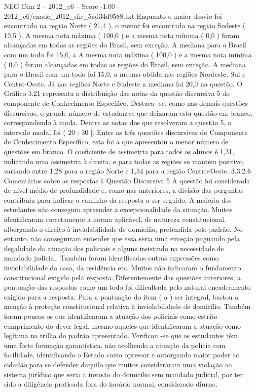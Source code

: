 \begin{textsample}{NEG Dim 2 – 2012\_c6 – Score -1.00 – 2012\_c6/enade\_2012\_dir\_5ad34d9588.txt}
Enquanto o maior desvio foi encontrado na região Norte ( 21,4 ), o menor foi encontrado na região Sudeste ( 19,5 ).
A mesma nota máxima ( 100,0 ) e a mesma nota mínima ( 0,0 ) foram alcançadas em todas as regiões do Brasil, sem exceção.
A mediana para o Brasil com um todo foi 15,0, a A mesma nota máxima ( 100,0 ) e a mesma nota mínima ( 0,0 ) foram alcançadas em todas as regiões do Brasil, sem exceção.
A mediana para o Brasil com um todo foi 15,0, a mesma obtida nas regiões Nordeste, Sul e Centro-Oeste.
Já nas regiões Norte e Sudeste a mediana foi 20,0 na questão.
O Gráfico 3.21 representa a distribuição das notas da questão discursiva 5 do componente de Conhecimento Específico.
Destaca -se, como nas demais questões discursivas, o grande número de estudantes que deixaram esta questão em branco, correspondendo à moda.
Dentre as notas dos que resolveram a questão 5, o intervalo modal foi ( 20 ; 30 ].
Entre as três questões discursivas do Componente de Conhecimento Específico, esta foi a que apresentou o menor número de questões em branco.
O coeficiente de assimetria para todos os alunos é 1,31, indicando uma assimetria à direita, e para todas as regiões se mantém positivo, variando entre 1,28 para a região Norte e 1,34 para a região Centro-Oeste. 3.3.2.6 Comentários sobre as respostas à Questão Discursiva 5 A questão foi considerada de nível médio de profundidade e, como nas anteriores, a divisão das perguntas contribuiu para indicar o caminho da resposta a ser seguido.
A maioria dos estudantes não conseguiu apreender a excepcionalidade da situação.
Muitos identificaram corretamente a norma aplicável, de natureza constitucional, albergando o direito à inviolabilidade de domicilio, pretendida pelo padrão.
No entanto, não conseguiram entender que essa seria uma exceção pugnando pela ilegalidade da atuação dos policiais e alguns insistindo na necessidade de mandado judicial.
Também foram identificadas outras expressões como inviolabilidade da casa, da residência etc.
Muitos não indicaram o fundamento constitucional exigido pela resposta.
Diferentemente das questões anteriores, a pontuação das respostas como um todo foi dificultada pelo natural encadeamento exigido para a resposta.
Para a pontuação do item ( a ) ser integral, bastou a menção à proteção constitucional relativa à inviolabilidade de domicílio.
Também foram poucos os que identificaram a atuação dos policiais como estrito cumprimento do dever legal, mesmo aqueles que identificaram a atuação como legítima na trilha do padrão apresentado.
Verificou -se que os estudantes têm uma forte formação garantística, não acolhendo a atuação da polícia com facilidade, identificando o Estado como opressor e outorgando maior poder ao cidadão para se defender daquilo que muitos consideraram uma violação ao sistema jurídico que seria a invasão do domicilio sem mandado judicial, por ter sido a diligência praticada fora do horário normal, considerado diurno.

\end{textsample}
